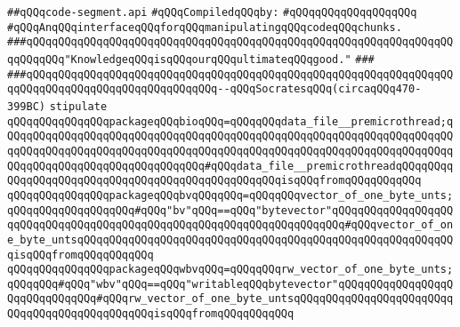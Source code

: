 \label{src/lib/compiler/execution/code-segments/code-segment.api}
\verb|##qQQqcode-segment.api|\newline
\newline
\verb|#qQQqCompiledqQQqby:|\newline
\verb|#qQQqqQQqqQQqqQQqqQQq|\newline
\newline
\newline
\newline
\verb|#qQQqAnqQQqinterfaceqQQqforqQQqmanipulatingqQQqcodeqQQqchunks.|\newline
\newline
\newline
\newline
\newline
\verb|###qQQqqQQqqQQqqQQqqQQqqQQqqQQqqQQqqQQqqQQqqQQqqQQqqQQqqQQqqQQqqQQqqQQqqQQqqQQq"KnowledgeqQQqisqQQqourqQQqultimateqQQqgood."|\newline
\verb|###|\newline
\verb|###qQQqqQQqqQQqqQQqqQQqqQQqqQQqqQQqqQQqqQQqqQQqqQQqqQQqqQQqqQQqqQQqqQQqqQQqqQQqqQQqqQQqqQQqqQQqqQQqqQQq--qQQqSocratesqQQq(circaqQQq470-399BC)|\newline
\newline
\newline
\verb|stipulate|\newline
\verb|qQQqqQQqqQQqqQQqpackageqQQqbioqQQq=qQQqqQQqdata_file__premicrothread;qQQqqQQqqQQqqQQqqQQqqQQqqQQqqQQqqQQqqQQqqQQqqQQqqQQqqQQqqQQqqQQqqQQqqQQqqQQqqQQqqQQqqQQqqQQqqQQqqQQqqQQqqQQqqQQqqQQqqQQqqQQqqQQqqQQqqQQqqQQqqQQqqQQqqQQqqQQqqQQqqQQqqQQqqQQq#qQQqdata_file__premicrothreadqQQqqQQqqQQqqQQqqQQqqQQqqQQqqQQqqQQqqQQqqQQqqQQqqQQqisqQQqfromqQQqqQQqqQQq|\newline
\verb|qQQqqQQqqQQqqQQqpackageqQQqbvqQQqqQQq=qQQqqQQqvector_of_one_byte_unts;qQQqqQQqqQQqqQQqqQQq#qQQq"bv"qQQq==qQQq"bytevector"qQQqqQQqqQQqqQQqqQQqqQQqqQQqqQQqqQQqqQQqqQQqqQQqqQQqqQQqqQQqqQQqqQQqqQQq#qQQqvector_of_one_byte_untsqQQqqQQqqQQqqQQqqQQqqQQqqQQqqQQqqQQqqQQqqQQqqQQqqQQqqQQqqQQqisqQQqfromqQQqqQQqqQQq|\newline
\verb|qQQqqQQqqQQqqQQqpackageqQQqwbvqQQq=qQQqqQQqrw_vector_of_one_byte_unts;qQQqqQQq#qQQq"wbv"qQQq==qQQq"writableqQQqbytevector"qQQqqQQqqQQqqQQqqQQqqQQqqQQqqQQq#qQQqrw_vector_of_one_byte_untsqQQqqQQqqQQqqQQqqQQqqQQqqQQqqQQqqQQqqQQqqQQqqQQqisqQQqfromqQQqqQQqqQQq|\newline
